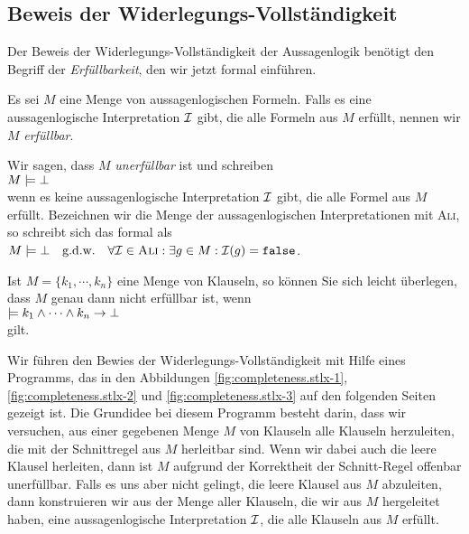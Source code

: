 \subsection{Beweis der Widerlegungs-Vollst\"{a}ndigkeit}
Der Beweis der Widerlegungs-Vollst\"{a}ndigkeit der Aussagenlogik ben\"{o}tigt den  Begriff der
\emph{\color{blue}Erf\"{u}llbarkeit}, den wir jetzt formal einf\"{u}hren. 

\begin{Definition}
  Es sei $M$ eine Menge von aussagenlogischen Formeln.
  Falls es eine aussagenlogische Interpretation $\mathcal{I}$ gibt, die alle Formeln aus $M$ erf\"{u}llt, nennen
  wir $M$ \emph{\color{blue}erf\"{u}llbar}. 

  Wir sagen, dass $M$ \emph{\color{blue}unerf\"{u}llbar} ist und schreiben 
  \\[0.2cm]
  \hspace*{1.3cm}
  $M \models \bot$
  \\[0.2cm]
  wenn es keine aussagenlogische Interpretation $\mathcal{I}$ gibt, die alle Formel aus $M$ erf\"{u}llt.
  Bezeichnen wir die Menge der aussagenlogischen Interpretationen mit
  \textsc{Ali}, so schreibt sich das formal als
  \\[0.2cm]
  \hspace*{1.3cm}
  $M \models \bot \quad \mbox{g.d.w.} \quad \forall \mathcal{I} \in \textsc{Ali}: \exists g \in M: \mathcal{I}(g) = \texttt{false}$.   
  \eox
\end{Definition}

\remark 
Ist $M = \{ k_1, \cdots, k_n \}$ eine Menge von Klauseln, so k\"{o}nnen Sie sich leicht \"{u}berlegen, dass
$M$ genau dann nicht erf\"{u}llbar ist, wenn
\\[0.2cm]
\hspace*{1.3cm}
$\models k_1 \wedge \cdots \wedge k_n \rightarrow \bot$
\\[0.2cm]
gilt. \eox

Wir f\"{u}hren den Bewies der Widerlegungs-Vollst\"{a}ndigkeit mit Hilfe eines Programms, das in den
Abbildungen \ref{fig:completeness.stlx-1}, \ref{fig:completeness.stlx-2} und
\ref{fig:completeness.stlx-3} auf den folgenden Seiten gezeigt ist.  Die Grundidee
bei diesem Programm besteht darin, dass wir versuchen, aus einer gegebenen Menge $M$ von Klauseln
alle Klauseln herzuleiten, die mit der Schnittregel aus $M$ herleitbar sind.  Wenn wir dabei auch
die leere Klausel herleiten, dann ist $M$ aufgrund der Korrektheit der Schnitt-Regel offenbar
unerf\"{u}llbar.  Falls es uns aber nicht gelingt, die leere Klausel aus $M$ abzuleiten, dann konstruieren wir
aus der Menge aller Klauseln, die wir aus $M$ hergeleitet haben, eine aussagenlogische Interpretation
$\mathcal{I}$, die alle Klauseln aus $M$ erf\"{u}llt.

